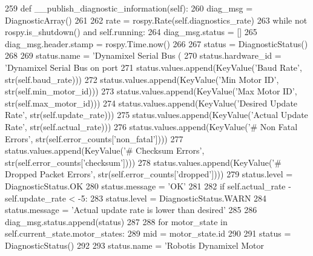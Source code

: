 \begin{DoxyCode}
259     \textcolor{keyword}{def }\_\_publish\_diagnostic\_information(self):
260         diag\_msg = DiagnosticArray()
261         
262         rate = rospy.Rate(self.diagnostics\_rate)
263         \textcolor{keywordflow}{while} \textcolor{keywordflow}{not} rospy.is\_shutdown() \textcolor{keywordflow}{and} self.running:
264             diag\_msg.status = []
265             diag\_msg.header.stamp = rospy.Time.now()
266             
267             status = DiagnosticStatus()
268             
269             status.name = \textcolor{stringliteral}{'Dynamixel Serial Bus (%
270             status.hardware\_id = \textcolor{stringliteral}{'Dynamixel Serial Bus on port %
271             status.values.append(KeyValue(\textcolor{stringliteral}{'Baud Rate'}, str(self.baud\_rate)))
272             status.values.append(KeyValue(\textcolor{stringliteral}{'Min Motor ID'}, str(self.min\_motor\_id)))
273             status.values.append(KeyValue(\textcolor{stringliteral}{'Max Motor ID'}, str(self.max\_motor\_id)))
274             status.values.append(KeyValue(\textcolor{stringliteral}{'Desired Update Rate'}, str(self.update\_rate)))
275             status.values.append(KeyValue(\textcolor{stringliteral}{'Actual Update Rate'}, str(self.actual\_rate)))
276             status.values.append(KeyValue(\textcolor{stringliteral}{'# Non Fatal Errors'}, str(self.error\_counts[\textcolor{stringliteral}{'non\_fatal'}])))
277             status.values.append(KeyValue(\textcolor{stringliteral}{'# Checksum Errors'}, str(self.error\_counts[\textcolor{stringliteral}{'checksum'}])))
278             status.values.append(KeyValue(\textcolor{stringliteral}{'# Dropped Packet Errors'}, str(self.error\_counts[\textcolor{stringliteral}{'dropped'}])))
279             status.level = DiagnosticStatus.OK
280             status.message = \textcolor{stringliteral}{'OK'}
281             
282             \textcolor{keywordflow}{if} self.actual\_rate - self.update\_rate < -5:
283                 status.level = DiagnosticStatus.WARN
284                 status.message = \textcolor{stringliteral}{'Actual update rate is lower than desired'}
285                 
286             diag\_msg.status.append(status)
287             
288             \textcolor{keywordflow}{for} motor\_state \textcolor{keywordflow}{in} self.current\_state.motor\_states:
289                 mid = motor\_state.id
290                 
291                 status = DiagnosticStatus()
292                 
293                 status.name = \textcolor{stringliteral}{'Robotis Dynamixel Motor %
}}}
\end{DoxyCode}
